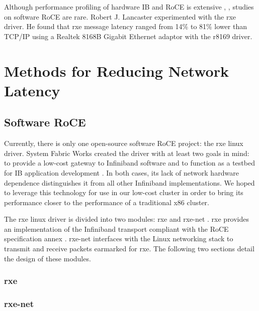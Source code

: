 \documentclass[a4paper]{article}
\begin{document}

Although performance profiling of hardware IB and RoCE is extensive
\cite{subamaroni-09}, \cite{vienne-12}, studies on software RoCE are
rare. Robert J. Lancaster \cite{lancaster-10} experimented with the rxe
driver. He found that rxe message latency ranged from 14\% to 81\% lower than
TCP/IP using a Realtek 8168B Gigabit Ethernet adaptor with the r8169 driver.


\newpage
\section{\textbf{Methods for Reducing Network Latency}}
\label{latency_reduction}

\subsection{\textbf{Software RoCE}}

Currently, there is only one open-source software RoCE project: the rxe linux
driver. System Fabric Works created the driver with at least two goals in mind:
to provide a low-cost gateway to Infiniband software and to function as a
testbed for IB application development \cite{pearson-10}. In both cases, its lack
of network hardware dependence distinguishes it from all other Infiniband
implementations. We hoped to leverage this technology for use in our low-cost
cluster in order to bring its performance closer to the performance of a
traditional x86 cluster.

The rxe linux driver is divided into two modules: rxe and rxe-net
\cite{pearson-10}. rxe provides an implementation of the Infiniband transport
compliant with the RoCE specification annex \cite{InfiniBandTARoCE-10}. rxe-net
interfaces with the Linux networking stack to transmit and receive packets
earmarked for rxe. The following two sections detail the design of these modules.

\subsubsection{\textbf{rxe}}

\subsubsection{\textbf{rxe-net}}
\end{document}
